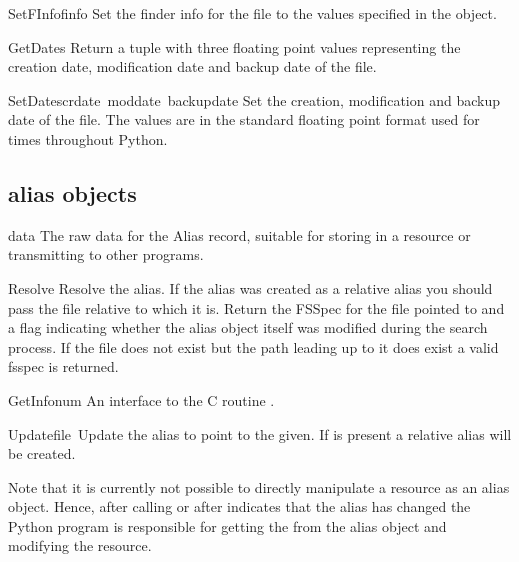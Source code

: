 \begin{funcdesc}{SetFInfo}{finfo}
Set the finder info for the file to the values specified in the
 object.
\end{funcdesc}

\begin{funcdesc}{GetDates}{}
Return a tuple with three floating point values representing the
creation date, modification date and backup date of the file.
\end{funcdesc}

\begin{funcdesc}{SetDates}{crdate\, moddate\, backupdate}
Set the creation, modification and backup date of the file. The values
are in the standard floating point format used for times throughout
Python.
\end{funcdesc}

\subsection{alias objects}

\renewcommand{\indexsubitem}{(alias object attribute)}
\begin{datadesc}{data}
The raw data for the Alias record, suitable for storing in a resource
or transmitting to other programs.
\end{datadesc}

\renewcommand{\indexsubitem}{(alias object method)}
\begin{funcdesc}{Resolve}{}
Resolve the alias. If the alias was created as a relative alias you
should pass the file relative to which it is. Return the FSSpec for
the file pointed to and a flag indicating whether the alias object
itself was modified during the search process. If the file does
not exist but the path leading up to it does exist a valid fsspec
is returned.
\end{funcdesc}

\begin{funcdesc}{GetInfo}{num}
An interface to the C routine .
\end{funcdesc}

\begin{funcdesc}{Update}{file\, }
Update the alias to point to the  given. If  is
present a relative alias will be created.
\end{funcdesc}

Note that it is currently not possible to directly manipulate a resource
as an alias object. Hence, after calling  or after
 indicates that the alias has changed the Python program
is responsible for getting the  from the alias object and
modifying the resource.


